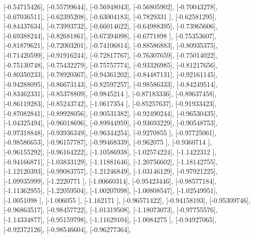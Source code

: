 \documentclass{article}
\begin{document}
       [-0.54715426],
       [-0.55799644],
       [-0.56948043],
       [-0.56805902],
       [-0.70043278],
       [-0.67036511],
       [-0.62395208],
       [-0.63004183],
       [-0.7829331 ],
       [-0.62581295],
       [-0.84437634],
       [-0.73993732],
       [-0.66014622],
       [-0.64988395],
       [-0.73965606],
       [-0.69388244],
       [-0.82681861],
       [-0.67394098],
       [-0.6771898 ],
       [-0.75353607],
       [-0.81879621],
       [-0.72003201],
       [-0.74106814],
       [-0.88586883],
       [-0.80935375],
       [-0.71420599],
       [-0.91916244],
       [-0.72817767],
       [-0.76307659],
       [-0.75014022],
       [-0.75130748],
       [-0.75432279],
       [-0.75757774],
       [-0.93326985],
       [-0.81217656],
       [-0.80350233],
       [-0.78920367],
       [-0.94361202],
       [-0.84487131],
       [-0.92161145],
       [-0.94288095],
       [-0.86673143],
       [-0.82597257],
       [-0.98586333],
       [-0.84249514],
       [-0.83462331],
       [-0.85378809],
       [-0.9845214 ],
       [-0.87183336],
       [-0.89637458],
       [-0.86119283],
       [-0.85243742],
       [-1.0617354 ],
       [-0.85257637],
       [-0.91933423],
       [-0.87082841],
       [-0.89928056],
       [-0.90531382],
       [-0.92490244],
       [-0.96530435],
       [-1.04325494],
       [-0.96018696],
       [-0.89944959],
       [-0.93693229],
       [-0.90548753],
       [-0.97318848],
       [-0.93936349],
       [-0.96344254],
       [-0.9270855 ],
       [-0.97725061],
       [-0.98586653],
       [-0.96157787],
       [-0.99468339],
       [-0.962075  ],
       [-0.9360714 ],
       [-0.96155292],
       [-0.96164222],
       [-1.10586938],
       [-1.02574224],
       [-1.1422312 ],
       [-0.94166871],
       [-1.03833129],
       [-1.11881646],
       [-1.20756602],
       [-1.18142755],
       [-1.12120393],
       [-0.99083757],
       [-1.21246849],
       [-1.03146129],
       [-0.97921225],
       [-1.09935999],
       [-1.2220771 ],
       [-1.00660314],
       [-0.95423446],
       [-0.98577184],
       [-1.11362955],
       [-1.22059504],
       [-1.00207098],
       [-1.00808547],
       [-1.02549951],
       [-1.0051098 ],
       [-1.006055  ],
       [-1.162171  ],
       [-0.96571422],
       [-0.94158193],
       [-0.95309746],
       [-0.96863517],
       [-0.98457722],
       [-1.01319508],
       [-1.18073073],
       [-0.97755576],
       [-1.14334877],
       [-0.95159798],
       [-1.11629104],
       [-1.0084275 ],
       [-0.94927065],
       [-0.92372126],
       [-0.98546604],
       [-0.96277364],
\end{document}
